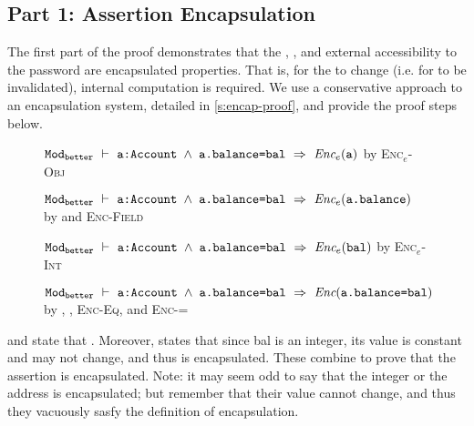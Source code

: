 \subsection{Part 1: Assertion Encapsulation}
\label{s:BA-encap}
The first part of the proof demonstrates that the , , and external accessibility to the password are 
encapsulated properties. That is, for the  to change (i.e. for  to be invalidated), 
internal computation is required. We use a conservative approach to an encapsulation system, detailed in  \ref{s:encap-proof}, 
and provide the proof steps below.
\\
\begin{figure}[h]
\begin{proofexample}
	{\begin{proofexample}
			{\proofstepwithrule
			{${\texttt{Mod}}_{{\texttt{better}}}\ \vdash\ {\texttt{a:Account $\wedge$ a.balance=bal}}\ \Rightarrow\ \textit{Enc$_e$}({\texttt{a}})$}
				{by \textsc{Enc$_e$-Obj}}
		}
		\endproofsteps
	\end{proofexample}
		}
	{\begin{proofexample}
		\proofsteps{\prg{balanceEnc}}
			{\proofstepwithrule
			{${\texttt{Mod}}_{{\texttt{better}}}\ \vdash\ {\texttt{a:Account $\wedge$ a.balance=bal}}\ \Rightarrow\ \textit{Enc$_e$}({\texttt{a.balance}})$}
				{by  and \textsc{Enc-Field}}
		}
		\endproofsteps
	\end{proofexample}
		}
	{\begin{proofexample}
		\proofsteps{\prg{balEnc}}
			{\proofstepwithrule
			{${\texttt{Mod}}_{{\texttt{better}}}\ \vdash\ {\texttt{a:Account $\wedge$ a.balance=bal}}\ \Rightarrow\ \textit{Enc$_e$}({\texttt{bal}})$}
				{by \textsc{Enc$_e$-Int}}
		}
		\endproofsteps
	\end{proofexample}
		}
		{\proofstepwithrule
			{
			${\texttt{Mod}}_{{\texttt{better}}}\ \vdash\ {\texttt{a:Account $\wedge$ a.balance=bal}}\ \Rightarrow\ \textit{Enc}({\texttt{a.balance=bal}})$
			}{by , , \textsc{Enc-Eq}, and \textsc{Enc-=}}}
\endproofsteps
\end{proofexample}
\end{figure}
\textbf{} and \textbf{} state that 
.
{Moreover,} \textbf{} states that since bal is an integer, {its} value is constant
and may not change, and thus is encapsulated.
These combine to prove that the assertion  is encapsulated.
Note: it may seem odd to say that the integer   { or the address
 is encapsulated};  {but remember that their value cannot change, and thus they
vacuously sasfy the definition of encapsulation.}

